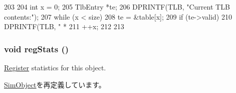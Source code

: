 \begin{DoxyCode}
203 {
204     int x = 0;
205     TlbEntry *te;
206     DPRINTF(TLB, "Current TLB contents:\n");
207     while (x < size) {
208         te = &table[x];
209         if (te->valid)
210             DPRINTF(TLB, " *  %
211         ++x;
212     }
213 }
\end{DoxyCode}
\hypertarget{classArmISA_1_1TLB_a4dc637449366fcdfc4e764cdf12d9b11}{
\subsubsection[{regStats}]{\setlength{\rightskip}{0pt plus 5cm}void regStats ()}}
\label{classArmISA_1_1TLB_a4dc637449366fcdfc4e764cdf12d9b11}
\hyperlink{classRegister}{Register} statistics for this object. 

\hyperlink{classSimObject_a4dc637449366fcdfc4e764cdf12d9b11}{SimObject}を再定義しています。


